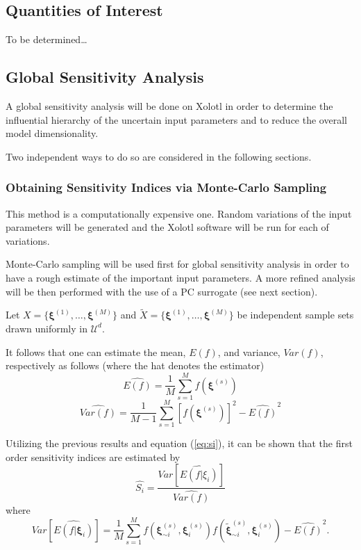 \documentclass{article}
\begin{document}
\subsection{Quantities of Interest}

To be determined\dots

\subsection{Global Sensitivity Analysis}

A global sensitivity analysis will be done on Xolotl in order to determine
the influential hierarchy of the uncertain input parameters and to reduce
the overall model dimensionality. 

Two independent ways to do so are considered in the following sections.

\subsubsection{Obtaining Sensitivity Indices via Monte-Carlo Sampling}

This method is a computationally expensive one. Random variations of the input
parameters will be generated and the Xolotl software will be run for each of variations.

Monte-Carlo sampling will be used first for global sensitivity analysis in order
to have a rough estimate of the important input parameters. A more refined
analysis will be then performed with the use of a PC surrogate (see next
section). \newline

Let $X = \{\boldsymbol{\xi}^{(1)}, \ldots, \boldsymbol{\xi}^{(M)}\}$ and
$\tilde{X} = \{\boldsymbol{\xi}^{(1)}, \ldots, \boldsymbol{\xi}^{(M)}\}$ be
independent sample sets drawn uniformly in $\mathcal{U}^d$.

It follows that one can estimate the mean, $E(f)$, and
variance, $Var(f)$, respectively as follows (where the hat denotes the
estimator)
\begin{equation}
	\widehat{E(f)} = \frac{1}{M} \sum_{s=1}^M f(\boldsymbol{\xi}^{(s)})
\end{equation}
\begin{equation}
	\widehat{Var(f)} = \frac{1}{M-1} \sum_{s=1}^M [f(\boldsymbol{\xi}^{(s)})]^2 -
	\widehat{E(f)}^2
\end{equation}

Utilizing the previous results and equation (\ref{eq:si}), it can be shown that
the first order sensitivity indices are estimated \cite{sobol} by
\begin{equation}
	\widehat{S_i} =
	\frac{Var[\widehat{E(f|\xi_i)}]}{\widehat{Var(f)}}
\end{equation}
where 
\[
	Var[\widehat{E(f|\boldsymbol{\xi}_i)}] = \frac{1}{M}
	\sum_{s=1}^M f(\boldsymbol{\xi}^{(s)}_{\sim i},\boldsymbol{\xi}^{(s)}_i)
	f(\boldsymbol{\tilde{\xi}}^{(s)}_{\sim i},\boldsymbol{\xi}^{(s)}_i) -
	\widehat{E(f)}^2 .
\]
\end{document}
